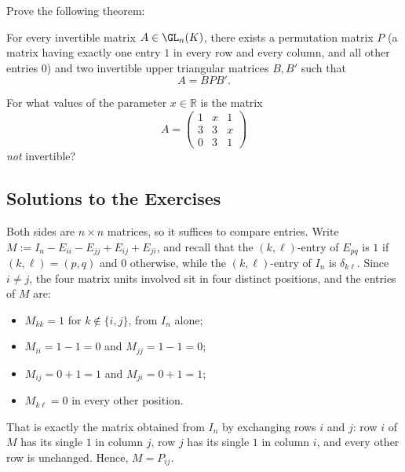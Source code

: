 \begin{exercise}
\label{exc:bruhat_decomposition}
Prove the following theorem:
\begin{theorem*}
For every invertible matrix $A \in \GL_n(K)$, there exists a permutation matrix $P$ (a matrix having exactly one entry $1$ in every row and every column, and all other entries $0$) and two invertible upper triangular matrices $B, B'$ such that
\[
A = B P B'.
\]
\end{theorem*}
\end{exercise}

\begin{exercise}
\label{exc:parametric_3x3_invertibility_mc}
For what values of the parameter $x \in \mathbb{R}$ is the matrix
\[
A = \begin{pmatrix} 1 & x & 1 \\ 3 & 3 & x \\ 0 & 3 & 1 \end{pmatrix}
\]
\emph{not} invertible?
\end{exercise}

\subsection{Solutions to the Exercises}
\label{sec:solutions_eros_revisited}

\begin{exercisesolution}
\label{sol:permutation_matrix_form}
Both sides are $n \times n$ matrices, so it suffices to compare entries. Write $M := I_n - E_{ii} - E_{jj} + E_{ij} + E_{ji}$, and recall that the $(k,\ell)$-entry of $E_{pq}$ is $1$ if $(k,\ell) = (p,q)$ and $0$ otherwise, while the $(k,\ell)$-entry of $I_n$ is $\delta_{k\ell}$. Since $i \neq j$, the four matrix units involved sit in four distinct positions, and the entries of $M$ are:
\begin{itemize}
    \item $M_{kk} = 1$ for $k \notin \{i, j\}$, from $I_n$ alone;
    \item $M_{ii} = 1 - 1 = 0$ and $M_{jj} = 1 - 1 = 0$;
    \item $M_{ij} = 0 + 1 = 1$ and $M_{ji} = 0 + 1 = 1$;
    \item $M_{k\ell} = 0$ in every other position.
\end{itemize}
That is exactly the matrix obtained from $I_n$ by exchanging rows $i$ and $j$: row $i$ of $M$ has its single $1$ in column $j$, row $j$ has its single $1$ in column $i$, and every other row is unchanged. Hence, $M = P_{ij}$.
\end{exercisesolution}

